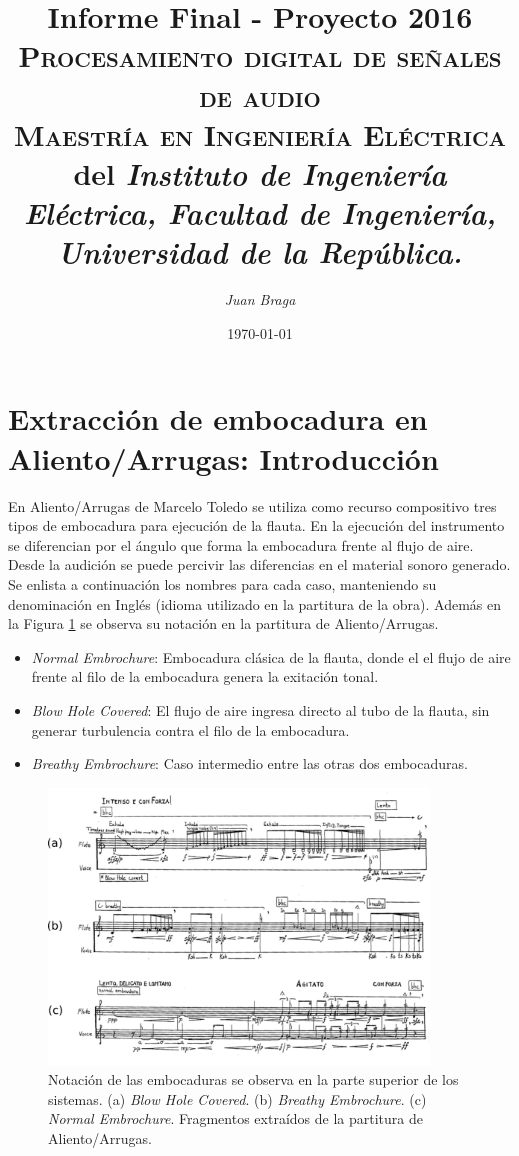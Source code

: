 \documentclass{article}
\title{\textbf{Informe Final - Proyecto 2016}\\\large \textsc{Procesamiento digital de señales de audio}\\
 \textsc{Maestría en Ingeniería Eléctrica} del \textit{Instituto de Ingeniería Eléctrica, Facultad de Ingeniería, Universidad de la República.}}
\author{\textit{Juan Braga}}
\date{\today}
\begin{document}
\maketitle 


\section*{Extracción de embocadura en Aliento/Arrugas: Introducción}
En Aliento/Arrugas de Marcelo Toledo se utiliza como recurso compositivo tres tipos de embocadura para ejecución de la flauta. En la ejecución del instrumento se diferencian por el ángulo que forma la embocadura frente al flujo de aire. Desde la audición se puede percivir las diferencias en el material sonoro generado. Se enlista a continuación los nombres para cada caso, manteniendo su denominación en Inglés (idioma utilizado en la partitura de la obra). Además en la Figura \ref{fig:embocaduras} se observa su notación en la partitura de Aliento/Arrugas.

\begin{itemize}
  \item \textit{Normal Embrochure}: Embocadura clásica de la flauta, donde el el flujo de aire frente al filo de la embocadura genera la exitación tonal. 
  \item \textit{Blow Hole Covered}: El flujo de aire ingresa directo al tubo de la flauta, sin generar turbulencia contra el filo de la embocadura. 
  \item \textit{Breathy Embrochure}: Caso intermedio entre las otras dos embocaduras. 
\end{itemize}
\medskip

\begin{figure}[H]
\begin{center}
\includegraphics[width=0.9\textwidth]{embocaduras} 
\caption{Notación de las embocaduras se observa en la parte superior de los sistemas. (a) \textit{Blow Hole Covered}. (b) \textit{Breathy Embrochure}. (c) \textit{Normal Embrochure}. Fragmentos extraídos de la partitura de Aliento/Arrugas.}
\label{fig:embocaduras}
\end{center}
\end{figure}
\end{document}
